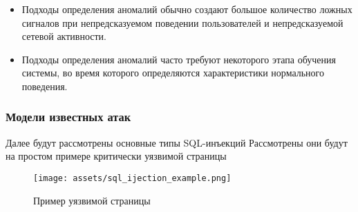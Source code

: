 \begin{itemize}
	\item Подходы определения аномалий обычно создают большое количество ложных сигналов 
	при непредсказуемом поведении пользователей и непредсказуемой сетевой активности.

	\item Подходы определения аномалий часто требуют некоторого этапа обучения системы, 
	во время которого определяются характеристики нормального поведения.
\end{itemize}



\subsubsection{Модели известных атак}

Далее будут рассмотрены основные типы SQL-инъекций \autocite{proglib} Рассмотрены они будут на простом примере критически уязвимой страницы
\begin{figure}[h]
    \centering
    \texttt{[image: assets/sql\_ijection\_example.png]}
    \caption{Пример уязвимой страницы}
    \label{fig:mesh1}
\end{figure}

